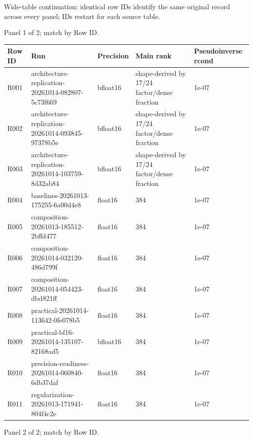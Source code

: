 \documentclass[10pt]{article}
\begin{document}
Wide-table continuation: identical row IDs identify the same original record across every panel; IDs restart for each source table.
\par\noindent Panel 1 of 2; match by Row ID.
{\scriptsize\setlength{\tabcolsep}{2pt}
\begin{longtable}{p{}p{}p{}p{}p{}}
Row ID & Run & Precision & Main rank & Pseudoinverse rcond \\
\hline\endhead
R001 & architecture-replication-20261014-082807-5c73f669 & bfloat16 & shape-derived by 17/24 factor/dense fraction & 1e-07 \\
R002 & architecture-replication-20261014-093845-97378b5e & bfloat16 & shape-derived by 17/24 factor/dense fraction & 1e-07 \\
R003 & architecture-replication-20261014-103759-8d32ab84 & bfloat16 & shape-derived by 17/24 factor/dense fraction & 1e-07 \\
R004 & baselines-20261013-175255-6a00d4e8 & float16 & 384 & 1e-07 \\
R005 & composition-20261013-185512-2bffd477 & float16 & 384 & 1e-07 \\
R006 & composition-20261014-032120-486d799f & float16 & 384 & 1e-07 \\
R007 & composition-20261014-054423-dbd821ff & float16 & 384 & 1e-07 \\
R008 & practical-20261014-113642-0fe078b5 & float16 & 384 & 1e-07 \\
R009 & practical-bf16-20261014-135107-82168ad5 & bfloat16 & 384 & 1e-07 \\
R010 & precision-readiness-20261014-060840-6db37daf & float16 & 384 & 1e-07 \\
R011 & regularization-20261013-171941-804f4c2e & float16 & 384 & 1e-07 \\
\end{longtable}}
\par\noindent Panel 2 of 2; match by Row ID.
\end{document}
